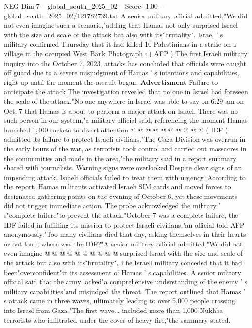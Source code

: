 \begin{textsample}{NEG Dim 7 – global\_south\_2025\_02 – Score -1.00 – global\_south\_2025\_02/121782739.txt}  \label{ex:f7_neg_036}
A senior military official admitted,"We did not even imagine such a scenario,"adding that Hamas not only surprised Israel with the size and scale of the attack but also with its"brutality".
Israel ' s military confirmed Thursday that it had killed 10 Palestinians in a strike on a village in the occupied West Bank Photograph : ( AFP ) The first Israeli military inquiry into the October 7, 2023, attacks has concluded that officials were caught off guard due to a severe misjudgment of Hamas ' s intentions and capabilities, right up until the moment the assault began. \textbf{Advertisment} Failure to anticipate the attack The investigation revealed that no one in Israel had foreseen the scale of the attack."No one anywhere in Israel was able to say on 6:29 am on Oct. 7 that Hamas is about to perform a major attack on Israel.
There was no such person in our system,"a military official said, referencing the moment Hamas launched 1,400 rockets to divert attention @ @ @ @ @ @ @ @ @ @ ( IDF ) admitted its failure to protect Israeli civilians."The Gaza Division was overrun in the early hours of the war, as terrorists took control and carried out massacres in the communities and roads in the area,"the military said in a report summary shared with journalists.
Warning signs were overlooked Despite clear signs of an impending attack, Israeli officials failed to treat them with urgency.
According to the report, Hamas militants activated Israeli SIM cards and moved forces to designated gathering points on the evening of October 6, yet these movements did not trigger immediate action.
The probe acknowledged the military ' s"complete failure"to prevent the attack."October 7 was a complete failure, the IDF failed in fulfilling its mission to protect Israeli civilians,"an official told AFP anonymously."Too many civilians died that day, asking themselves in their hearts or out loud, where was the IDF?"A senior military official admitted,"We did not even imagine @ @ @ @ @ @ @ @ @ @ surprised Israel with the size and scale of the attack but also with its"brutality".
The Israeli military conceded that it had been"overconfident"in its assessment of Hamas ' s capabilities.
A senior military official said that the army lacked"a comprehensive understanding of the enemy ' s military capabilities"and misjudged the threat.
The report outlined that Hamas ' s attack came in three waves, ultimately leading to over 5,000 people crossing into Israel from Gaza."The first wave... included more than 1,000 Nukhba terrorists who infiltrated under the cover of heavy fire,"the summary stated.

\end{textsample}
